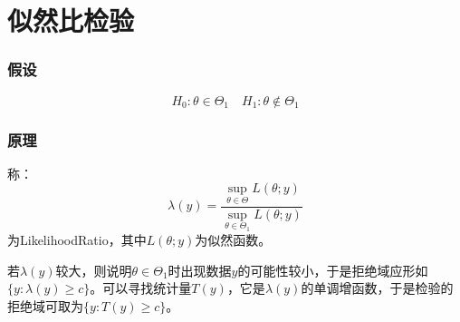 \section{似然比检验}
\label{method:LikelihoodTest}

\subsubsection{假设}
\begin{equation*}
	H_0:\theta\in\Theta_1\quad H_1:\theta\notin\Theta_1
\end{equation*}
\subsubsection{原理}
\begin{definition}
	称：
	\begin{equation*}
		\lambda(y)=\frac{\sup\limits_{\theta\in\Theta}L(\theta;y)}{\sup\limits_{\theta\in\Theta_1}L(\theta;y)}
	\end{equation*}
	为\gls{LikelihoodRatio}，其中$L(\theta;y)$为似然函数。
\end{definition}
\begin{derivation}
	若$\lambda(y)$较大，则说明$\theta\in\Theta_1$时出现数据$y$的可能性较小，于是拒绝域应形如$\{y:\lambda(y)\geqslant c\}$。可以寻找统计量$T(y)$，它是$\lambda(y)$的单调增函数，于是检验的拒绝域可取为$\{y:T(y)\geqslant c\}$。
\end{derivation}
